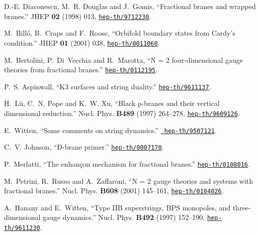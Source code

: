 \documentclass[a4paper,11pt]{article}
\begin{document}
\begin{thebibliography}{10}
D.-E. Diaconescu, M.~R. Douglas and J.~Gomis, ``Fractional branes and wrapped
  branes.'' JHEP {\bf 02} (1998) 013,
  \href{http://xxx.lanl.gov/abs/hep-th/9712230}{{\tt hep-th/9712230}}.

M.~Bill\'o, B.~Craps and F.~Roose, ``Orbifold boundary states from Cardy's
  condition.'' JHEP {\bf 01} (2001) 038,
  \href{http://xxx.lanl.gov/abs/hep-th/0011060}{{\tt hep-th/0011060}}.

M.~Bertolini, P.~Di~Vecchia and R.~Marotta, ``N = 2 four-dimensional gauge
  theories from fractional branes.''
  \href{http://xxx.lanl.gov/abs/hep-th/0112195}{{\tt hep-th/0112195}}.

P.~S. Aspinwall, ``K3 surfaces and string duality.''
  \href{http://xxx.lanl.gov/abs/hep-th/9611137}{{\tt hep-th/9611137}}.

H.~L{\"u}, C.~N. Pope and K.~W. Xu, ``Black p-branes and their vertical
  dimensional reduction.'' Nucl. Phys. {\bf B489} (1997) 264--278,
  \href{http://xxx.lanl.gov/abs/hep-th/9609126}{{\tt hep-th/9609126}}.

E.~Witten, ``Some comments on string dynamics.''
  \href{http://xxx.lanl.gov/abs/http://arXiv.org/abs/hep-th/9507121}{{\tt
  hep-th/9507121}}. %

C.~V. Johnson, ``D-brane primer.''
  \href{http://xxx.lanl.gov/abs/hep-th/0007170}{{\tt hep-th/0007170}}.

P.~Merlatti, ``The enhan\c{c}on mechanism for fractional branes.''
  \href{http://xxx.lanl.gov/abs/hep-th/0108016}{{\tt hep-th/0108016}}.

M.~Petrini, R.~Russo and A.~Zaffaroni, ``N = 2 gauge theories and systems with
  fractional branes.'' Nucl. Phys. {\bf B608} (2001) 145--161,
  \href{http://xxx.lanl.gov/abs/hep-th/0104026}{{\tt hep-th/0104026}}.

A.~Hanany and E.~Witten, ``Type {IIB} superstrings, {BPS} monopoles, and
  three-dimensional gauge dynamics.'' Nucl. Phys. {\bf B492} (1997) 152--190,
  \href{http://xxx.lanl.gov/abs/hep-th/9611230}{{\tt hep-th/9611230}}.


\end{thebibliography}
\end{document}

